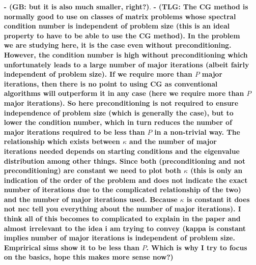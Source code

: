 \documentclass[useAMS,usenatbib]{mn2e}
\newcommand{\bH}{\bmath{H}}
\begin{document}
{\bf - (GB: but it is also much smaller, right?)}.
{\bf - (TLG: The CG method is normally good to use on classes of matrix problems whose spectral condition number 
is independent of problem size (this is an ideal property to have to be able to use the 
CG method). In the problem we are studying here, it is the case even without preconditioning. However, 
the condition number is high without preconditioning which unfortunately leads to a large number of major iterations (albeit fairly independent 
of problem size). If we require more than $P$ major iterations, then there is no point to using CG as conventional algorithms will 
outperform it in any case (here we require more than $P$ major iterations). So here preconditioning is not required to ensure independence of problem size (which is 
generally the case), but to lower the condition number, which in turn reduces the number of major iterations required to be less than $P$ in a non-trivial way. 
The relationship which exists between $\kappa$ and the number of major iterations needed depends on starting conditions and the eigenvalue distribution among other things. 
Since both (preconditioning and not preconditioning) are constant we need to plot both $\kappa$ (this is only an indication of the order of the problem and does not 
indicate the exact number of iterations due to the complicated relationship of the two) and the number of major iterations used. Because $\kappa$ is constant it does not nec tell 
you everything about the number of major iterations). I think all of this becomes to complicated to explain in the paper and almost irrelevant to the idea i am trying to convey (kappa is constant implies number of major 
iterations is independent of problem size. Emprirical sims show it to be less than $P$. Which is why I try to focus on the basics, hope this makes more sense now?)}

\end{document}
